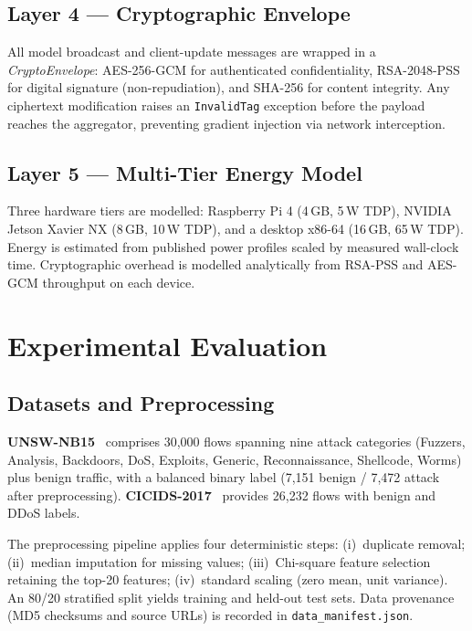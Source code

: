 \documentclass[11pt,a4paper,twocolumn]{article}
\theoremstyle{definition}
\begin{document}
\subsection{Layer 4 — Cryptographic Envelope}
\label{sec:layer4}

All model broadcast and client-update messages are wrapped in a
\textit{CryptoEnvelope}: AES-256-GCM for authenticated confidentiality,
RSA-2048-PSS for digital signature (non-repudiation), and SHA-256 for
content integrity.  Any ciphertext modification raises an
\texttt{InvalidTag} exception before the payload reaches the aggregator,
preventing gradient injection via network interception.

\subsection{Layer 5 — Multi-Tier Energy Model}
\label{sec:layer5}

Three hardware tiers are modelled: Raspberry Pi 4 (4\,GB, 5\,W TDP),
NVIDIA Jetson Xavier NX (8\,GB, 10\,W TDP), and a desktop x86-64
(16\,GB, 65\,W TDP).  Energy is estimated from published power profiles
scaled by measured wall-clock time.  Cryptographic overhead is modelled
analytically from RSA-PSS and AES-GCM throughput on each device.

\section{Experimental Evaluation}
\label{sec:experiments}

\subsection{Datasets and Preprocessing}
\label{sec:data}

\textbf{UNSW-NB15}~\cite{moustafa2015} comprises 30,000 flows spanning
nine attack categories (Fuzzers, Analysis, Backdoors, DoS, Exploits,
Generic, Reconnaissance, Shellcode, Worms) plus benign traffic, with a
balanced binary label (7,151 benign / 7,472 attack after preprocessing).
\textbf{CICIDS-2017}~\cite{sharafaldin2018} provides 26,232 flows with
benign and DDoS labels.

The preprocessing pipeline applies four deterministic steps:
(i)~duplicate removal;
(ii)~median imputation for missing values;
(iii)~Chi-square feature selection retaining the top-20 features;
(iv)~standard scaling (zero mean, unit variance).
An 80/20 stratified split yields training and held-out test sets.
Data provenance (MD5 checksums and source URLs) is recorded in
\texttt{data\_manifest.json}.
\end{document}
